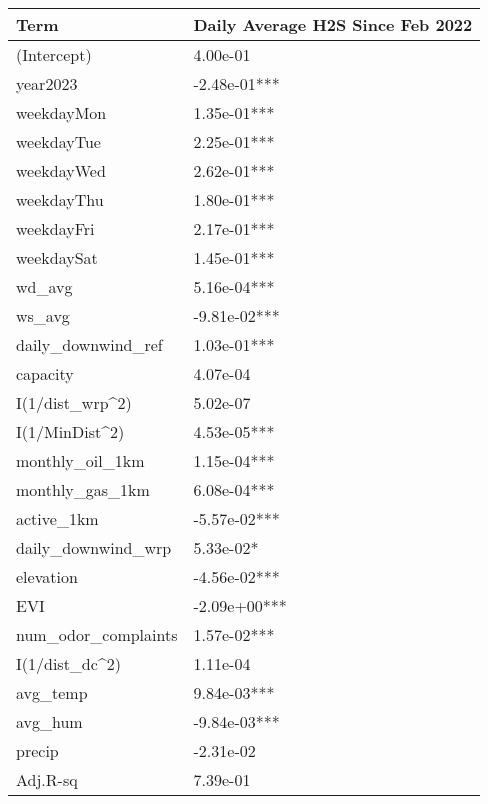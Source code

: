 
\begin{tabular}{l|l}
\hline
Term & Daily Average H2S Since Feb 2022\\
\hline
(Intercept) & 4.00e-01\\
\hline
year2023 & -2.48e-01***\\
\hline
weekdayMon & 1.35e-01***\\
\hline
weekdayTue & 2.25e-01***\\
\hline
weekdayWed & 2.62e-01***\\
\hline
weekdayThu & 1.80e-01***\\
\hline
weekdayFri & 2.17e-01***\\
\hline
weekdaySat & 1.45e-01***\\
\hline
wd\_avg & 5.16e-04***\\
\hline
ws\_avg & -9.81e-02***\\
\hline
daily\_downwind\_ref & 1.03e-01***\\
\hline
capacity & 4.07e-04\\
\hline
I(1/dist\_wrp\textasciicircum{}2) & 5.02e-07\\
\hline
I(1/MinDist\textasciicircum{}2) & 4.53e-05***\\
\hline
monthly\_oil\_1km & 1.15e-04***\\
\hline
monthly\_gas\_1km & 6.08e-04***\\
\hline
active\_1km & -5.57e-02***\\
\hline
daily\_downwind\_wrp & 5.33e-02*\\
\hline
elevation & -4.56e-02***\\
\hline
EVI & -2.09e+00***\\
\hline
num\_odor\_complaints & 1.57e-02***\\
\hline
I(1/dist\_dc\textasciicircum{}2) & 1.11e-04\\
\hline
avg\_temp & 9.84e-03***\\
\hline
avg\_hum & -9.84e-03***\\
\hline
precip & -2.31e-02\\
\hline
Adj.R-sq & 7.39e-01\\
\hline
\end{tabular}
